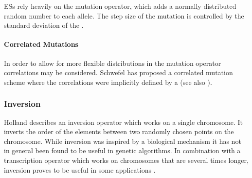 ESs rely heavily on the mutation operator, which adds a normally distributed
random number to each allele.
The step size of the mutation is controlled by the standard deviation of
the .


        \paragraph{Correlated Mutations}

In order to allow for more flexible distributions in the mutation
operator correlations may be considered.  Schwefel \cite{Schwefel:77}
has proposed a correlated mutation scheme where the correlations were
implicitly defined by a  (see also \cite{Rudolph:92}).


%       



        \subsubsection{Inversion}

Holland \cite{Holland:75} describes an inversion operator which works
on a single chromosome.  It inverts the order of the elements between
two randomly chosen points on the chromosome.  While inversion was
inspired by a biological mechanism it has not in general been found to
be useful in genetic algorithms.  In combination with a transcription
operator which works on chromosomes that are several times longer,
inversion proves to be useful in some applications \cite{Wienholt:93}.
